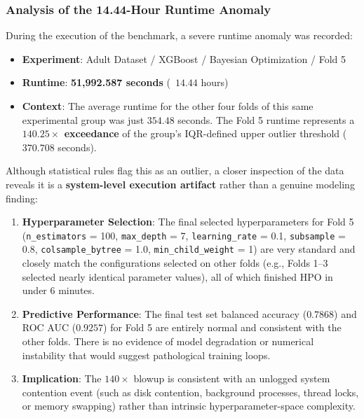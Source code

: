 \documentclass[11pt,a4paper]{article}
\begin{document}
\subsubsection{Analysis of the 14.44-Hour Runtime Anomaly}
During the execution of the benchmark, a severe runtime anomaly was recorded:
\begin{itemize}
    \item \textbf{Experiment}: Adult Dataset / XGBoost / Bayesian Optimization / Fold 5
    \item \textbf{Runtime}: \textbf{51,992.587 seconds} (~$14.44$ hours)
    \item \textbf{Context}: The average runtime for the other four folds of this same experimental group was just $354.48$ seconds. The Fold 5 runtime represents a \textbf{$140.25\times$ exceedance} of the group's IQR-defined upper outlier threshold ($370.708$ seconds).
\end{itemize}

Although statistical rules flag this as an outlier, a closer inspection of the data reveals it is a \textbf{system-level execution artifact} rather than a genuine modeling finding:
\begin{enumerate}
    \item \textbf{Hyperparameter Selection}: The final selected hyperparameters for Fold 5 (\texttt{n\_estimators} = 100, \texttt{max\_depth} = 7, \texttt{learning\_rate} = 0.1, \texttt{subsample} = 0.8, \texttt{colsample\_bytree} = 1.0, \texttt{min\_child\_weight} = 1) are very standard and closely match the configurations selected on other folds (e.g., Folds 1–3 selected nearly identical parameter values), all of which finished HPO in under 6 minutes.
    \item \textbf{Predictive Performance}: The final test set balanced accuracy ($0.7868$) and ROC AUC ($0.9257$) for Fold 5 are entirely normal and consistent with the other folds. There is no evidence of model degradation or numerical instability that would suggest pathological training loops.
    \item \textbf{Implication}: The $140\times$ blowup is consistent with an unlogged system contention event (such as disk contention, background processes, thread locks, or memory swapping) rather than intrinsic hyperparameter-space complexity.
\end{enumerate}
\end{document}
